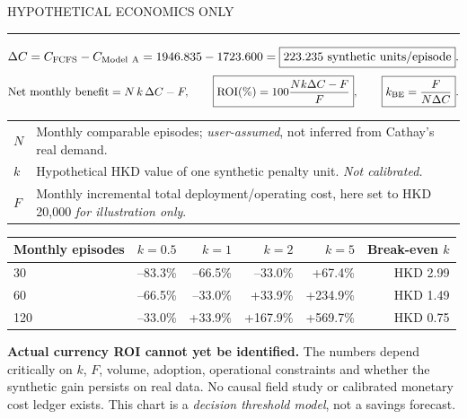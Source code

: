 \documentclass[10pt,a4paper]{article}
\newcommand{\sect}[2]{\vspace{4mm}{\Large\sffamily\bfseries #1}\hfill{\small\sffamily\color{muted}#2}\par\vspace{1mm}\color{sage}\rule{\linewidth}{1.0pt}\color{ink}\vspace{2mm}}
\begin{document}
\sect{12 / ROI and break-even sensitivity}{HYPOTHETICAL ECONOMICS ONLY}
\[
\Delta C = C_{\rm FCFS}-C_{\rm Model\ A}=1946.835-1723.600=\boxed{223.235\text{ synthetic units/episode}}.
\]
\[
\text{Net monthly benefit}=N\,k\,\Delta C-F,\qquad
\boxed{\mathrm{ROI}(\%)=100\frac{Nk\Delta C-F}{F}},\qquad
\boxed{k_{\rm BE}=\frac{F}{N\Delta C}}.
\]
\begin{tabularx}{\linewidth}{@{}p{21mm}X@{}}
$N$ & Monthly comparable episodes; \emph{user-assumed}, not inferred from Cathay's real demand.\\
$k$ & Hypothetical HKD value of one synthetic penalty unit. \emph{Not calibrated.}\\
$F$ & Monthly incremental total deployment/operating cost, here set to HKD 20,000 \emph{for illustration only}.\\
\end{tabularx}
\par\vspace{2mm}
\begin{tabularx}{\linewidth}{@{}lrrrrr@{}}
\toprule
Monthly episodes & $k=0.5$ & $k=1$ & $k=2$ & $k=5$ & Break-even $k$\\\midrule
30 & --83.3\% & --66.5\% & --33.0\% & +67.4\% & HKD 2.99\\
60 & --66.5\% & --33.0\% & +33.9\% & +234.9\% & HKD 1.49\\
120 & --33.0\% & +33.9\% & +167.9\% & +569.7\% & HKD 0.75\\
\bottomrule
\end{tabularx}
\begin{caution}
\textbf{Actual currency ROI cannot yet be identified.} The numbers depend critically on $k$, $F$, volume, adoption, operational constraints and whether the synthetic gain persists on real data. No causal field study or calibrated monetary cost ledger exists. This chart is a \emph{decision threshold model}, not a savings forecast.
\end{caution}
\newpage
\end{document}
